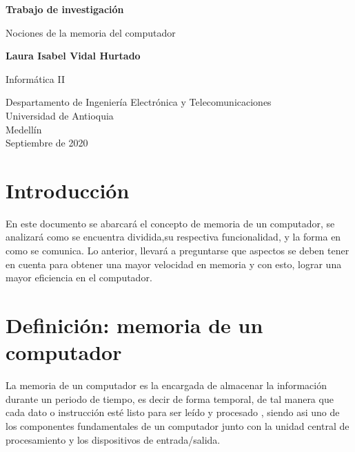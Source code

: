 \documentclass{article}
\begin{document}
\begin{titlepage}
    \begin{center}
        \vspace*{1cm}
            
        \Huge
        \textbf{Trabajo de investigación}
            
        \vspace{0.5cm}
        \LARGE
        Nociones de la memoria del computador
            
        \vspace{1.5cm}
            
        \textbf{Laura Isabel Vidal Hurtado}
        
        \vspace{1.5cm}
        \LARGE
        Informática II    
        \vfill
         
        \vspace{0.8cm}
            
        \Large
        Despartamento de Ingeniería Electrónica y Telecomunicaciones\\
        Universidad de Antioquia\\
        Medellín\\
        Septiembre de 2020
            
    \end{center}
\end{titlepage}

\tableofcontents

\section{Introducción}

En este documento se abarcará el concepto de memoria de un computador, se analizará como se encuentra dividida,su respectiva funcionalidad, y la forma en como se comunica. Lo anterior, llevará a preguntarse que aspectos se deben tener en cuenta para obtener una mayor velocidad en memoria y con esto, lograr una mayor eficiencia en el computador.


\section{Definición: memoria de un computador}

La memoria de un computador es la encargada de almacenar la información durante un periodo de tiempo, es decir de forma temporal, de tal manera que cada dato o instrucción esté listo para ser leído y procesado , siendo asi uno de los componentes fundamentales de un computador junto con la unidad central de procesamiento y los dispositivos de entrada/salida.
\end{document}
